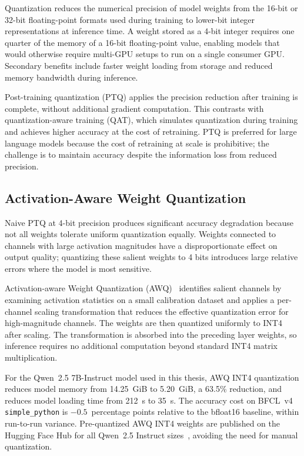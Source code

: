 Quantization reduces the numerical precision of model weights from
the 16-bit or 32-bit floating-point formats used during training to
lower-bit integer representations at inference time. A weight stored
as a 4-bit integer requires one quarter of the memory of a 16-bit
floating-point value, enabling models that would otherwise require
multi-GPU setups to run on a single consumer GPU. Secondary benefits
include faster weight loading from storage and reduced memory
bandwidth during inference.

Post-training quantization (PTQ) applies the precision reduction
after training is complete, without additional gradient computation.
This contrasts with quantization-aware training (QAT), which
simulates quantization during training and achieves higher accuracy
at the cost of retraining. PTQ is preferred for large language
models because the cost of retraining at scale is prohibitive; the
challenge is to maintain accuracy despite the information loss from
reduced precision.

\subsection{Activation-Aware Weight Quantization}

Naive PTQ at 4-bit precision produces significant accuracy
degradation because not all weights tolerate uniform quantization
equally. Weights connected to channels with large activation
magnitudes have a disproportionate effect on output quality;
quantizing these salient weights to 4 bits introduces large
relative errors where the model is most sensitive.

Activation-aware Weight Quantization (AWQ)~\cite{lin2024awq}
identifies salient channels by examining activation statistics on a
small calibration dataset and applies a per-channel scaling
transformation that reduces the effective quantization error for
high-magnitude channels. The weights are then quantized uniformly
to INT4 after scaling. The transformation is absorbed into the
preceding layer weights, so inference requires no additional
computation beyond standard INT4 matrix multiplication.

For the Qwen~2.5 7B-Instruct model used in this thesis, AWQ INT4
quantization reduces model memory from 14.25~GiB to 5.20~GiB, a
63.5\% reduction, and reduces model loading time from 212~s to 35~s.
The accuracy cost on BFCL~v4 \texttt{simple\_python} is
$-0.5$~percentage points relative to the bfloat16 baseline, within
run-to-run variance. Pre-quantized AWQ INT4 weights are published
on the Hugging Face Hub for all Qwen~2.5 Instruct
sizes~\cite{qwen2024qwen25}, avoiding the need for manual
quantization.

